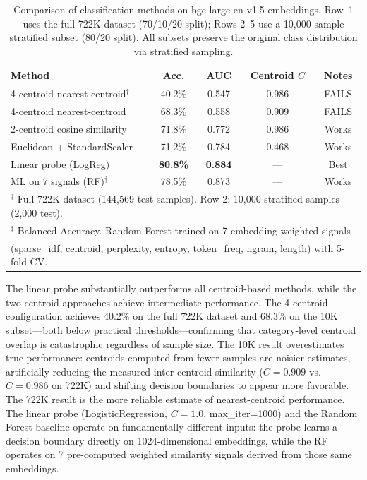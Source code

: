 \documentclass[12pt,a4paper]{article}
\begin{document}
\begin{table}[H]
\centering
\caption{Comparison of classification methods on bge-large-en-v1.5 embeddings. Row~1 uses the full 722K dataset (70/10/20 split); Rows 2--5 use a 10,000-sample stratified subset (80/20 split). All subsets preserve the original class distribution via stratified sampling.}
\label{tab:method_comparison}
\begin{tabular}{@{}lcccc@{}}
\toprule
\textbf{Method} & \textbf{Acc.} & \textbf{AUC} & \textbf{Centroid $C$} & \textbf{Notes} \\
\midrule
4-centroid nearest-centroid$^{\dagger}$ & 40.2\% & 0.547 & 0.986 & FAILS \\
4-centroid nearest-centroid & 68.3\% & 0.558 & 0.909 & FAILS \\
2-centroid cosine similarity & 71.8\% & 0.772 & 0.986 & Works \\
Euclidean + StandardScaler & 71.2\% & 0.784 & 0.468 & Works \\
Linear probe (LogReg) & \textbf{80.8\%} & \textbf{0.884} & --- & Best \\
\midrule
ML on 7 signals (RF)$^{\ddagger}$ & 78.5\% & 0.873 & --- & Works \\
\bottomrule
\multicolumn{5}{l}{\small $^{\dagger}$ Full 722K dataset (144,569 test samples). Row 2: 10,000 stratified samples (2,000 test).} \\
\multicolumn{5}{l}{\small $^{\ddagger}$ Balanced Accuracy. Random Forest trained on 7 embedding weighted signals} \\
\multicolumn{5}{l}{\small \hspace{1.5em} (sparse\_idf, centroid, perplexity, entropy, token\_freq, ngram, length) with 5-fold CV.}
\end{tabular}
\end{table}

The linear probe substantially outperforms all centroid-based methods, while the two-centroid approaches achieve intermediate performance. The 4-centroid configuration achieves 40.2\% on the full 722K dataset and 68.3\% on the 10K subset---both below practical thresholds---confirming that category-level centroid overlap is catastrophic regardless of sample size. The 10K result overestimates true performance: centroids computed from fewer samples are noisier estimates, artificially reducing the measured inter-centroid similarity ($C = 0.909$ vs.\ $C = 0.986$ on 722K) and shifting decision boundaries to appear more favorable. The 722K result is the more reliable estimate of nearest-centroid performance. The linear probe (LogisticRegression, $C=1.0$, max\_iter=1000) and the Random Forest baseline operate on fundamentally different inputs: the probe learns a decision boundary directly on 1024-dimensional embeddings, while the RF operates on 7 pre-computed weighted similarity signals derived from those same embeddings.
\end{document}

